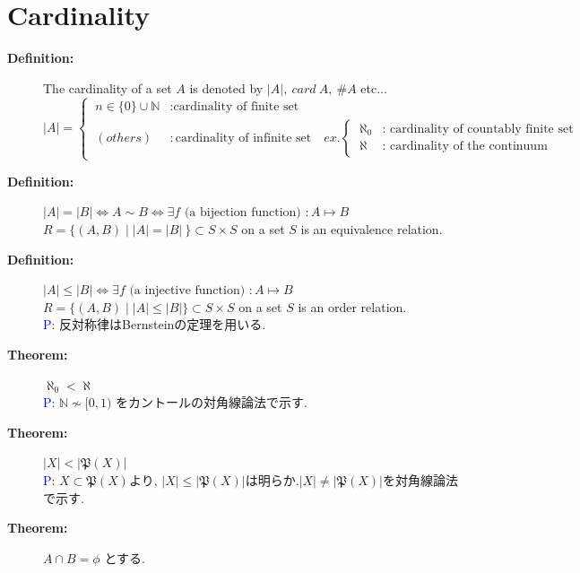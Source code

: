 \documentclass[english,dvipdfmx]{jsarticle}
\newcommand*{\proof}{\textcircled{\textcolor{blue}{\scriptsize P}}}
\begin{document}
\section{Cardinality}
    \begin{description}
        \item[\bf{Definition:}] The cardinality of a set $A$ is denoted by $|A|,\ card \ A ,\ \# A $ etc...
            \begin{equation*}
                |A| = 
                \begin{cases}
                    \ n \in \{ 0 \} \cup \mathbb{N} &: \text{cardinality of finite set } \\
                    \ (others) &: \text{cardinality of infinite set} \quad ex.
                    \begin{cases}
                        \ \aleph_0 &: \text{ cardinality of countably finite set } \\
                        \ \aleph &: \text{ cardinality of the continuum }
                    \end{cases}
                \end{cases}
            \end{equation*}
        \item[\bf{Definition:}] $|A| = |B| \Leftrightarrow A \sim B \Leftrightarrow \exists f \text{ (a bijection function) } : A \longmapsto B $ \\
            $ R = \{ (A,B) \mid |A| = |B| \ \} \subset S \times S$ on a set $S$ is an equivalence relation. 
        \item[\bf{Definition:}] $|A| \leq |B|  \Leftrightarrow \exists f \text{ (a injective function) } : A \longmapsto B $ \\
            $ R = \{ (A,B) \mid |A| \leq |B|  \} \subset S \times S$ on a set $S$ is an order relation. \\
            \proof : 反対称律はBernsteinの定理を用いる.
        \item[\bf{Theorem:}] $ \aleph_0 < \aleph $ \\
            \proof : $ \mathbb{N} \not\sim  [ 0, 1 )$ をカントールの対角線論法で示す.
        \item[\bf{Theorem:}] $ |X| < |\mathfrak{P}(X)| $ \\
            \proof : $X \subset \mathfrak{P}(X)$より, $|X| \leq |\mathfrak{P}(X)|$は明らか.$|X| \not= |\mathfrak{P}(X)|$を対角線論法で示す.
        \item[\bf{Theorem:}] $A \cap B = \phi$ とする.
            \begin{enumerate}

\end{enumerate}
\end{description}
\end{document}
